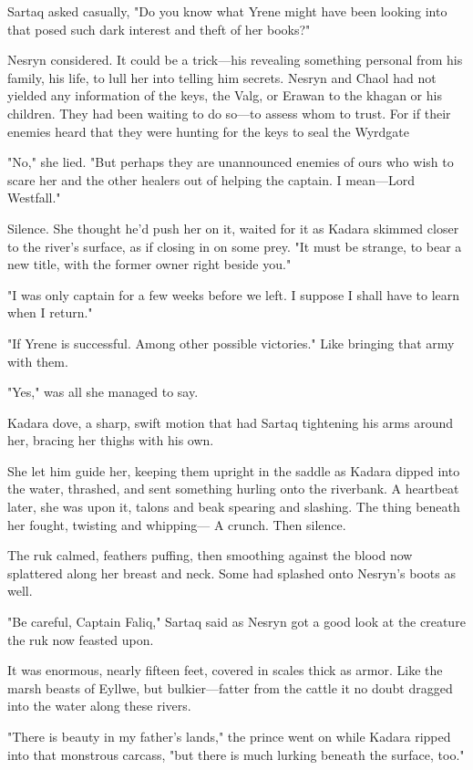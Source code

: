 Sartaq asked casually, "Do you know what Yrene might have been looking into that posed such dark interest and theft of her books?"

Nesryn considered.
It could be a trick---his revealing something personal from his family, his life, to lull her into telling him secrets.
Nesryn and Chaol had not yielded any information of the keys, the Valg, or Erawan to the khagan or his children.
They had been waiting to do so---to assess whom to trust.
For if their enemies heard that they were hunting for the keys to seal the Wyrdgate 

"No," she lied.
"But perhaps they are unannounced enemies of ours who wish to scare her and the other healers out of helping the captain.
I mean---Lord Westfall."

Silence.
She thought he'd push her on it, waited for it as Kadara skimmed closer to the river's surface, as if closing in on some prey.
"It must be strange, to bear a new title, with the former owner right beside you."

"I was only captain for a few weeks before we left.
I suppose I shall have to learn when I return."

"If Yrene is successful.
Among other possible victories."
Like bringing that army with them.

"Yes," was all she managed to say.

Kadara dove, a sharp, swift motion that had Sartaq tightening his arms around her, bracing her thighs with his own.

She let him guide her, keeping them upright in the saddle as Kadara dipped into the water, thrashed, and sent something hurling onto the riverbank.
A heartbeat later, she was upon it, talons and beak spearing and slashing.
The thing beneath her fought, twisting and whipping--- A crunch.
Then silence.

The ruk calmed, feathers puffing, then smoothing against the blood now splattered along her breast and neck.
Some had splashed onto Nesryn's boots as well.

"Be careful, Captain Faliq," Sartaq said as Nesryn got a good look at the creature the ruk now feasted upon.

It was enormous, nearly fifteen feet, covered in scales thick as armor.
Like the marsh beasts of Eyllwe, but bulkier---fatter from the cattle it no doubt dragged into the water along these rivers.

"There is beauty in my father's lands," the prince went on while Kadara ripped into that monstrous carcass, "but there is much lurking beneath the surface, too."


